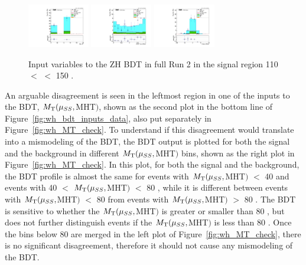\begin{figure}[!htb]
  \includegraphics[width=0.24\textwidth]{pics/VH_sec/valid_BDT_ZH/lep_ID.pdf}
  \includegraphics[width=0.24\textwidth]{pics/VH_sec/valid_BDT_ZH/cts_dipair_H.pdf}
  \includegraphics[width=0.24\textwidth]{pics/VH_sec/valid_BDT_ZH/dipair_dEta_H.pdf}
  \caption{Input variables to the ZH BDT in full Run 2 in the signal region 110 \GeV $<$ \mmm $<$ 150 \GeV.}
  \label{fig:zh_bdt_inputs_data}
\end{figure}

An arguable disagreement is seen in the leftmost region in one of the inputs to the \WH BDT, $M_{\mathrm{T}}(\mu_{SS}, $MHT$)$,
shown as the second plot in the bottom line of Figure~\ref{fig:wh_bdt_inputs_data}, also put separately in Figure~\ref{fig:wh_MT_check}. 
To understand if this disagreement would translate into a mismodeling of the \WH BDT, 
the BDT output is plotted for both the signal and the background in different $M_{\mathrm{T}}(\mu_{SS}, $MHT$)$ bins, 
shown as the right plot in Figure~\ref{fig:wh_MT_check}.
In this plot, for both the signal and the background, 
the BDT profile is almost the same for events with $M_{\mathrm{T}}(\mu_{SS}, $MHT$)$ $<$ 40 \GeV and events with 40 $<$ $M_{\mathrm{T}}(\mu_{SS}, $MHT$)$ $<$ 80 \GeV,
while it is different between events with $M_{\mathrm{T}}(\mu_{SS}, $MHT$)$ $<$ 80 \GeV from events with $M_{\mathrm{T}}(\mu_{SS}, $MHT$)$ $>$ 80 \GeV.  
The BDT is sensitive to whether the $M_{\mathrm{T}}(\mu_{SS}, $MHT$)$ is greater or smaller than 80 \GeV, 
but does not further distinguish events if the $M_{\mathrm{T}}(\mu_{SS}, $MHT$)$ is less than 80 \GeV.
Once the bins below 80 \GeV are merged in the left plot of Figure~\ref{fig:wh_MT_check}, there is no significant disagreement, 
therefore it should not cause any mismodeling of the BDT.

